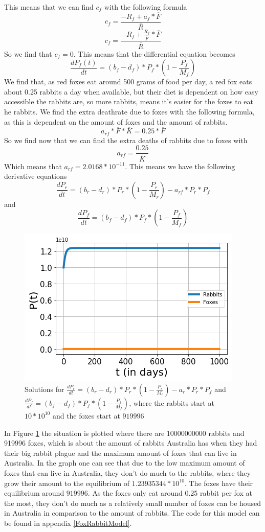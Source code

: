 \documentclass{article}
\begin{document}
This means that we can find $c_f$ with the following formula
$$c_f=\frac{-R_f+a_f*\overline{F}}{\overline{R}}$$
$$c_f=\frac{-R_f+\frac{R_f}{\overline{F}}*\overline{F}}{\overline{R}}$$
So we find that $c_f=0$. This means that the differential equation becomes 
$$\frac{dP_f(t)}{dt}=(b_f-d_f)*P_f*(1-\frac{P_f}{M_f})$$
We find that, as red foxes eat around 500 grams of food per day, a red fox eats about 0.25 rabbits a day when available, but their diet is dependent on how easy accessible the rabbits are, so more rabbits, means it's easier for the foxes to eat he rabbits.\cite{FoxFood} We find the extra deathrate due to foxes with the following formula, as this is dependent on the amount of foxes and the amount of rabbits.
$$a_{rf}*\overline{F}*\overline{K}=0.25*\overline{F}$$
So we find now that we can find the extra deaths of rabbits due to foxes with
$$a_{rf}=\frac{0.25}{\overline{K}}$$
Which means that $a_{rf}=2.0168*10^{-11}$. This means we have the following derivative equations
$$\frac{dP_r}{dt}=(b_r-d_r)*P_r*(1-\frac{P_r}{M_r})-a_{rf}*P_r*P_f$$
and
$$\frac{dP_f}{dt}=(b_f-d_f)*P_f*(1-\frac{P_f}{M_f})$$
\begin{figure}[ht!]
    \centering
    \includegraphics[scale=0.78]{Pictures/RabbitFoxes.png}
    \caption{Solutions for $\frac{dP_r}{dt}=(b_r-d_r)*P_r*(1-\frac{P_r}{M_r})-a_r*P_r*P_f$ and $\frac{dP_f}{dt}=(b_f-d_f)*P_f*(1-\frac{P_f}{M_f})$, where the rabbits start at $10*10^{10}$ and the foxes start at $919996$}
    \label{fig:RabbitFoxes}
\end{figure}
In Figure \ref{fig:RabbitFoxes} the situation is plotted where there are 10000000000 rabbits and 919996 foxes, which is about the amount of rabbits Australia has when they had their big rabbit plague and the maximum amount of foxes that can live in Australia. In the graph one can see that due to the low maximum amount of foxes that can live in Australia, they don't do much to the rabbits, where they grow their amount to the equilibrium of $1.23935344*10^10$. The foxes have their equilibrium around $919996$. As the foxes only eat around 0.25 rabbit per fox at the most, they don't do much as a relatively small number of foxes can be housed in Australia in comparison to the amount of rabbits. The code for this model can be found in appendix \ref{FoxRabbitModel}.
\end{document}
